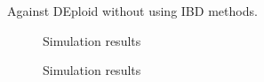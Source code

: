 \documentclass{article}
\begin{document}
Against DEploid without using IBD methods.
\begin{figure}[htp]
  \centering{}
  \caption{Simulation results}
\end{figure}
\begin{figure}
  \ContinuedFloat
  \centering
  \caption{Simulation results}
\end{figure}
\end{document}
